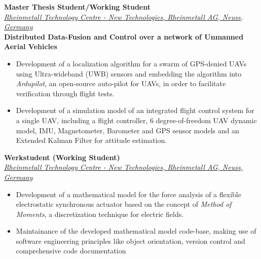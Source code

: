 \large{\textbf{Master Thesis Student/Working Student}}
\hfill
\masterarbeitdate\\
\href{https://www.rheinmetall.com/de/karriere/rheinmetall-als-arbeitgeber/menschen-projekte/karriere-extra-technology-center}{\large{\emph{Rheinmetall Technology Centre - New Technologies, Rheinmetall AG, Neuss, Germany}}}\\
\large{\textbf{Distributed Data-Fusion and Control over a network of Unmanned Aerial Vehicles}}
\begin{itemize}
	\item Development of a localization algorithm for a swarm of GPS-denied UAVs using Ultra-wideband (UWB) sensors and embedding the algorithm into \emph{Ardupilot}, an open-source auto-pilot for UAVs, in order to facilitate verification through flight tests.
    \item Development of a simulation model of an integrated flight control system for a single UAV, including a flight controller, 6 degree-of-freedom UAV dynamic model, IMU, Magnetometer, Barometer and GPS sensor models and an Extended Kalman Filter for attitude estimation.
\end{itemize}

\vspace{0.1 in}

\large{\textbf{Werkstudent (Working Student)}}
\hfill
\rheinmetalldate\\
\href{https://www.rheinmetall.com/de/karriere/rheinmetall-als-arbeitgeber/menschen-projekte/karriere-extra-technology-center}{\large{\emph{Rheinmetall Technology Centre - New Technologies, Rheinmetall AG, Neuss, Germany}}}
\begin{itemize}
\item\large{Development of a mathematical model for the force analysis of a flexible electrostatic synchronous actuator based on the concept of \emph{Method of Moments}, a discretization technique for electric fields.}
\item\large{Maintainance of the developed mathematical model code-base, making use of software engineering principles like object orientation, version control and comprehensive code documentation}
\end{itemize}

\vspace{0.1 in}

